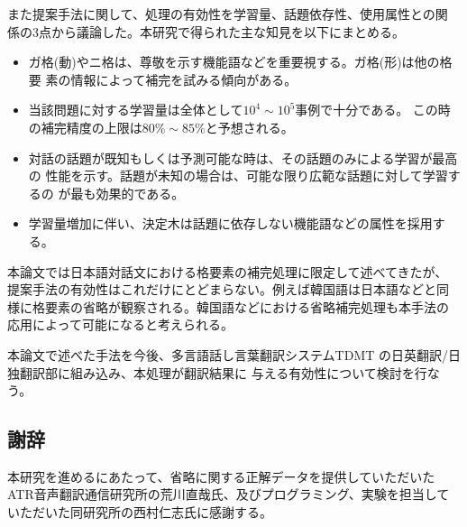 また提案手法に関して、処理の有効性を学習量、話題依存性、使用属性との関
係の3点から議論した。本研究で得られた主な知見を以下にまとめる。

\begin{itemize}
\item
ガ格(動)やニ格は、尊敬を示す機能語などを重要視する。ガ格(形)は他の格要
素の情報によって補完を試みる傾向がある。
\item 
当該問題に対する学習量は全体として$10^4 \sim10^5$事例で十分である。
この時の補完精度の上限は$80\% \sim 85\%$と予想される。
\item
対話の話題が既知もしくは予測可能な時は、その話題のみによる学習が最高の
性能を示す。話題が未知の場合は、可能な限り広範な話題に対して学習するの
が最も効果的である。
\item
学習量増加に伴い、決定木は話題に依存しない機能語などの属性を採用する。
\end{itemize}

本論文では日本語対話文における格要素の補完処理に限定して述べてきたが、
提案手法の有効性はこれだけにとどまらない。例えば韓国語は日本語などと同
様に格要素の省略が観察される。韓国語などにおける省略補完処理も本手法の
応用によって可能になると考えられる。

本論文で述べた手法を今後、多言語話し言葉翻訳システムTDMT
{}\cite{TDMTmulti}の日英翻訳/日独翻訳部に組み込み、本処理が翻訳結果に
与える有効性について検討を行なう。


\vspace*{-10mm}

\subsection*{謝辞}

本研究を進めるにあたって、省略に関する正解データを提供していただいた
ATR音声翻訳通信研究所の荒川直哉氏、及びプログラミング、実験を担当して
いただいた同研究所の西村仁志氏に感謝する。



